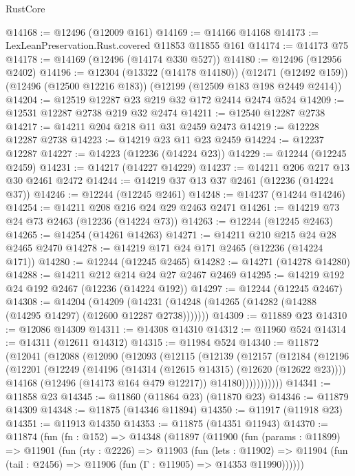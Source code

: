 \begin{lexlean}{RustCore}
\begin{coremodule}
@14168 := @12496 (@12009 @161)
@14169 := @14166 @14168
@14173 := LexLeanPreservation.Rust.covered @11853 @11855 @161
@14174 := @14173 @75
@14178 := @14169 (@12496 (@14174 @330 @527))
@14180 := @12496 (@12956 @2402)
@14196 := @12304
    (@13322 (@14178 @14180))
    (@12471 (@12492 @159))
    (@12496 (@12500 @12216 @183))
    (@12199 (@12509 @183 @198 @2449 @2414))
@14204 := @12519 @12287 @23 @219 @32 @172 @2414 @2474 @524
@14209 := @12531 @12287 @2738 @219 @32 @2474
@14211 := @12540 @12287 @2738
@14217 := @14211 @204 @218 @11 @31 @2459 @2473
@14219 := @12228 @12287 @2738
@14223 := @14219 @23 @11 @23 @2459
@14224 := @12237 @12287
@14227 := @14223 (@12236 (@14224 @23))
@14229 := @12244 (@12245 @2459)
@14231 := @14217 (@14227 @14229)
@14237 := @14211 @206 @217 @13 @30 @2461 @2472
@14244 := @14219 @37 @13 @37 @2461 (@12236 (@14224 @37))
@14246 := @12244 (@12245 @2461)
@14248 := @14237 (@14244 @14246)
@14254 := @14211 @208 @216 @24 @29 @2463 @2471
@14261 := @14219 @73 @24 @73 @2463 (@12236 (@14224 @73))
@14263 := @12244 (@12245 @2463)
@14265 := @14254 (@14261 @14263)
@14271 := @14211 @210 @215 @24 @28 @2465 @2470
@14278 := @14219 @171 @24 @171 @2465 (@12236 (@14224 @171))
@14280 := @12244 (@12245 @2465)
@14282 := @14271 (@14278 @14280)
@14288 := @14211 @212 @214 @24 @27 @2467 @2469
@14295 := @14219 @192 @24 @192 @2467 (@12236 (@14224 @192))
@14297 := @12244 (@12245 @2467)
@14308 := @14204
    (@14209 (@14231 (@14248 (@14265 (@14282 (@14288 (@14295 @14297) (@12600 @12287 @2738)))))))
@14309 := @11889 @23
@14310 := @12086 @14309
@14311 := @14308 @14310
@14312 := @11960 @524
@14314 := @14311 (@12611 @14312)
@14315 := @11984 @524
@14340 := @11872
    (@12041
      (@12088
        (@12090
          (@12093
            (@12115
              (@12139
                (@12157
                  (@12184
                    (@12196
                      (@12201
                        (@12249
                          (@14196 (@14314 (@12615 @14315) (@12620 (@12622 @23))))
                          @14168
                          (@12496 (@14173 @164 @479 @12217))
                          @14180)))))))))))
@14341 := @11858 @23
@14345 := @11860 (@11864 @23) (@11870 @23)
@14346 := @11879 @14309
@14348 := @11875 (@14346 @11894)
@14350 := @11917 (@11918 @23)
@14351 := @11913 @14350
@14353 := @11875 (@14351 @11943)
@14370 := @11874
    (fun (fn : @152) =>
    @14348
      (@11897
        (@11900
          (fun (params : @11899) =>
          @11901
            (fun (rty : @2226) =>
            @11903
              (fun (lets : @11902) =>
              @11904 (fun (tail : @2456) => @11906 (fun (Γ : @11905) => @14353 @11990))))))

\end{coremodule}
\end{lexlean}
